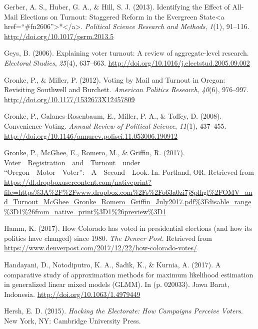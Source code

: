 \documentclass[12pt,twoside]{reedthesis}
\begin{document}
  \hypertarget{ref-gerber_identifying_2013}{}
  Gerber, A. S., Huber, G. A., \& Hill, S. J. (2013). Identifying the
  Effect of All-Mail Elections on Turnout: Staggered Reform in the
  Evergreen State\textless{}a
  href=``\#fn2606''\textgreater{}*\textless{}/a\textgreater{}.
  \emph{Political Science Research and Methods}, \emph{1}(1), 91--116.
  \url{http://doi.org/10.1017/psrm.2013.5}
  
  \hypertarget{ref-geys_explaining_2006}{}
  Geys, B. (2006). Explaining voter turnout: A review of aggregate-level
  research. \emph{Electoral Studies}, \emph{25}(4), 637--663.
  \url{http://doi.org/10.1016/j.electstud.2005.09.002}
  
  \hypertarget{ref-gronke_voting_2012}{}
  Gronke, P., \& Miller, P. (2012). Voting by Mail and Turnout in Oregon:
  Revisiting Southwell and Burchett. \emph{American Politics Research},
  \emph{40}(6), 976--997. \url{http://doi.org/10.1177/1532673X12457809}
  
  \hypertarget{ref-gronke_convenience_2008}{}
  Gronke, P., Galanes-Rosenbaum, E., Miller, P. A., \& Toffey, D. (2008).
  Convenience Voting. \emph{Annual Review of Political Science},
  \emph{11}(1), 437--455.
  \url{http://doi.org/10.1146/annurev.polisci.11.053006.190912}
  
  \hypertarget{ref-gronke_voter_2017}{}
  Gronke, P., McGhee, E., Romero, M., \& Griffin, R. (2017).
  Voter~~Registration~~and~~Turnout~~under
  ``Oregon~~Motor~~Voter'':~~A~~Second~~Look. In. Portland, OR. Retrieved
  from
  \url{https://dl.dropboxusercontent.com/nativeprint?file=https\%3A\%2F\%2Fwww.dropbox.com\%2Fs\%2Fo63a0zi7j8plhgl\%2FOMV_and_Turnout_McGhee_Gronke_Romero_Griffin_July2017.pdf\%3Fdisable_range\%3D1\%26from_native_print\%3D1\%26preview\%3D1}
  
  \hypertarget{ref-hamm_how_2017}{}
  Hamm, K. (2017). How Colorado has voted in presidential elections (and
  how its politics have changed) since 1980. \emph{The Denver Post}.
  Retrieved from
  \url{https://www.denverpost.com/2017/12/22/how-colorado-votes/}
  
  \hypertarget{ref-handayani_comparative_2017}{}
  Handayani, D., Notodiputro, K. A., Sadik, K., \& Kurnia, A. (2017). A
  comparative study of approximation methods for maximum likelihood
  estimation in generalized linear mixed models (GLMM). In (p. 020033).
  Jawa Barat, Indonesia. \url{http://doi.org/10.1063/1.4979449}
  
  \hypertarget{ref-hersh_hacking_2015}{}
  Hersh, E. D. (2015). \emph{Hacking the Electorate: How Campaigns
  Perceive Voters}. New York, NY: Cambridge University Press.
  
\end{document}
